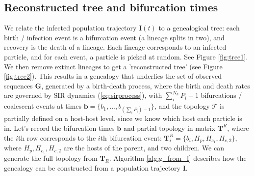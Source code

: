 \documentclass[a4paper,18pt]{report}
\begin{document}
\subsection{Reconstructed tree and bifurcation times}
We relate the infected population trajectory $\mathbf{I}(t)$ to a genealogical tree: each birth / infection event is a bifurcation event (a lineage splits in two), and recovery is the death of a lineage. Each lineage corresponds to an infected particle, and for each event, a particle is picked at random.
See Figure \ref{fig:tree1}. We then remove extinct lineages to get a 'reconstructed tree' (see Figure \ref{fig:tree2}). This results in a genealogy that underlies the set of observed sequences  $\mathbf{G}$, generated by a birth-death process, where the birth and death rates are governed by SIR dynamics (\ref{eq:sirprocess}), with  $\sum_i^{N_h} P_i - 1$ bifurcations / coalescent events at times $\mathbf{b}=\{b_1,...,b_{(\sum_i P_i)-1}\}$, and the topology $\mathcal{T}$ is partially defined on a host-host level, since we know which host each particle is in. Let's record the bifurcation times $\mathbf{b}$ and partial topology in matrix $\mathbf{T}^R$, where the $i$th row corresponds to the $i$th bifurcation event: $\mathbf{T}^R_i=\{b_i, H_p, H_{c_1}, H_{c,2}\}$, where $H_p, H_{c_1}, H_{c,2}$ are the hosts of the parent, and two children. We can generate the full topology from $\mathbf{T}_R$. Algorithm \ref{alg:g_from_I} describes how the genealogy can be constructed from a population trajectory $\mathbf{I}$. 
\end{document}
